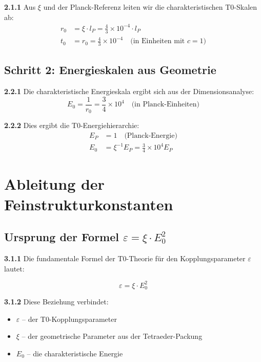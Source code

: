 \documentclass[12pt,a4paper]{article}
\newcommand{\lP}{l_P}
\newcommand{\EP}{E_P}
\newcommand{\rzero}{r_0}
\newcommand{\tzero}{t_0}
\newcommand{\Ezero}{E_0}
\newcommand{\xipar}{\xi}
\begin{document}
	\noindent \textbf{2.1.1} Aus $\xipar$ und der Planck-Referenz leiten wir die charakteristischen T0-Skalen ab:
	\begin{align}
		\rzero &= \xipar \cdot \lP = \frac{4}{3} \times 10^{-4} \cdot \lP \\
		\tzero &= \rzero = \frac{4}{3} \times 10^{-4} \quad \text{(in Einheiten mit } c=1\text{)}
	\end{align}
	
	\subsection{Schritt 2: Energieskalen aus Geometrie}
	
	\noindent \textbf{2.2.1} Die charakteristische Energieskala ergibt sich aus der Dimensionsanalyse:
	\begin{equation}
		\Ezero = \frac{1}{\rzero} = \frac{3}{4} \times 10^{4} \quad \text{(in Planck-Einheiten)}
	\end{equation}
	
	\noindent \textbf{2.2.2} Dies ergibt die T0-Energiehierarchie:
	\begin{align}
		\EP &= 1 \quad \text{(Planck-Energie)} \\
		\Ezero &= \xipar^{-1} \EP = \frac{3}{4} \times 10^{4} \EP
	\end{align}
	
	\section{Ableitung der Feinstrukturkonstanten}
	
	\subsection{Ursprung der Formel $\varepsilon = \xipar \cdot \Ezero^2$}
	
	\noindent \textbf{3.1.1} Die fundamentale Formel der T0-Theorie für den Kopplungsparameter $\varepsilon$ lautet:
	\begin{keyresult}
		\begin{equation}
			\boxed{\varepsilon = \xipar \cdot \Ezero^2}
			\label{eq:epsilon_definition}
		\end{equation}
	\end{keyresult}
	
	\noindent \textbf{3.1.2} Diese Beziehung verbindet:
	\begin{itemize}
		\item $\varepsilon$ -- der T0-Kopplungsparameter
		\item $\xipar$ -- der geometrische Parameter aus der Tetraeder-Packung
		\item $\Ezero$ -- die charakteristische Energie
	\end{itemize}
	
\end{document}
